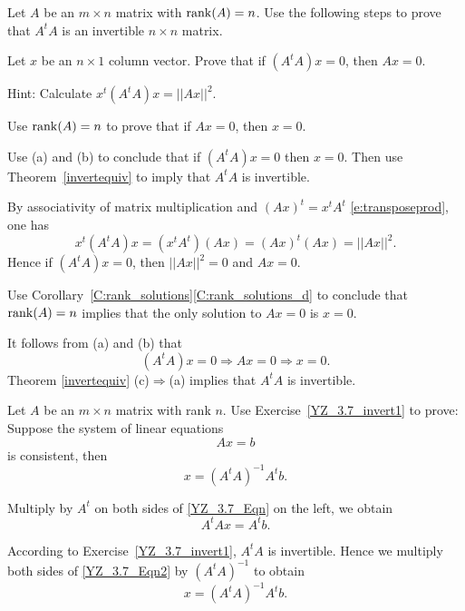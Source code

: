 \documentclass{ximera}
\begin{document}
\begin{exercise} \label{YZ_3.7_invert1}

Let $A$ be an $m\times n$ matrix with ${\rm rank}(A) = n$. Use the following steps to 
prove that $A^tA$ is an invertible $n\times n$ matrix.
\begin{enumeratea}

\item Let $x$ be an $n \times 1$ column vector. Prove that if $(A^tA)x = 0$, then $Ax = 0$. 

Hint: Calculate $x^t(A^tA)x = ||Ax||^2$.

\item Use ${\rm rank}(A) = n$ to prove that if $Ax =0$, then $x = 0$. 

\item Use (a) and (b) to conclude that if $(A^tA)x = 0$ then $x = 0$. Then use Theorem~\ref{invertequiv} to imply that $A^tA$ is invertible. 

\end{enumeratea}


\begin{solution}
\soln

\begin{enumeratea}
\item By associativity of matrix multiplication and $(Ax)^t=x^tA^t$ \eqref{e:transposeprod}, one has
\[
x^t(A^tA)x = (x^tA^t)(Ax) = (Ax)^t(Ax) = ||Ax||^2.
\]
 Hence if $(A^tA)x = 0$, then $||Ax||^2 = 0$ and $Ax = 0$. 
\item Use Corollary~\ref{C:rank_solutions}\eqref{C:rank_solutions_d} to conclude that ${\rm rank}(A) = n$ implies that the only solution to $Ax = 0$ is $x=0$.

\item It follows from (a) and (b) that 
\[
(A^tA)x = 0 \Longrightarrow Ax = 0 \Longrightarrow x = 0.
\]
Theorem \ref{invertequiv} (c)$\Rightarrow$(a) implies that $A^tA$ is invertible.
\end{enumeratea}
\end{solution}
\end{exercise}


\begin{exercise} \label{YZ_3.7_invert2} 
Let $A$ be an $m\times n$ matrix with rank $n$.  Use Exercise~\ref{YZ_3.7_invert1} to prove:  
Suppose the system of linear equations 
\begin{equation} 
    Ax=b \label{YZ_3.7_Eqn}
\end{equation}
is consistent, then 
\[
x=(A^tA)^{-1}A^tb.
\]

\begin{solution}
\soln
Multiply by $A^t$ on both sides of \eqref{YZ_3.7_Eqn} on the left, we obtain
\begin{equation}
    A^tAx=A^tb. \label{YZ_3.7_Eqn2}
\end{equation}

According to Exercise~\ref{YZ_3.7_invert1}, $A^tA$ is invertible.  Hence we multiply 
both sides of \eqref{YZ_3.7_Eqn2} by $(A^tA)^{-1}$ to obtain
\[
x=(A^tA)^{-1}A^tb.
\]
\end{solution}

\end{exercise}
\end{document}
